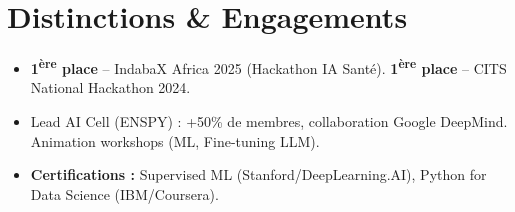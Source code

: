 \documentclass[a4paper,11pt]{article}
\begin{document}
\section{Distinctions \& Engagements}
\begin{itemize}[leftmargin=*, label=\tiny$\bullet$, nosep]
    \item \small{\textbf{1\textsuperscript{ère} place} -- IndabaX Africa 2025 (Hackathon IA Santé). \textbf{1\textsuperscript{ère} place} -- CITS National Hackathon 2024.}
    \item \small{Lead AI Cell (ENSPY) : +50\% de membres, collaboration Google DeepMind. Animation workshops (ML, Fine-tuning LLM).}
    \item \small{\textbf{Certifications :} Supervised ML (Stanford/DeepLearning.AI), Python for Data Science (IBM/Coursera).}
\end{itemize}
\end{document}
